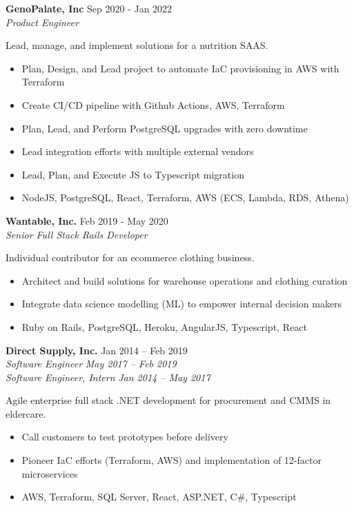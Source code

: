 \documentclass[line,margin]{res}
\begin{document}
\begin{resume}
\textbf{GenoPalate, Inc} \hfill Sep 2020 - Jan 2022 \\
{\sl Product Engineer}

Lead, manage, and implement solutions for a nutrition SAAS.

\begin{itemize}
\item Plan, Design, and Lead project to automate IaC provisioning in AWS with Terraform
\item Create CI/CD pipeline with Github Actions, AWS, Terraform
\item Plan, Lead, and Perform PostgreSQL upgrades with zero downtime
\item Lead integration efforts with multiple external vendors
\item Lead, Plan, and Execute JS to Typescript migration
\item NodeJS, PostgreSQL, React, Terraform, AWS (ECS, Lambda, RDS, Athena)
\end{itemize}

\textbf{Wantable, Inc.} \hfill Feb 2019 - May 2020 \\
{\sl Senior Full Stack Rails Developer}

Individual contributor for an ecommerce clothing business.

\begin{itemize}
\item Architect and build solutions for warehouse operations and clothing curation
\item Integrate data science modelling (ML) to empower internal decision makers
\item Ruby on Rails, PostgreSQL, Heroku, AngularJS, Typescript, React
\end{itemize}

\textbf{Direct Supply, Inc.} \hfill Jan 2014 -- Feb 2019 \\
{\sl Software Engineer} \hfill {\sl May 2017 -- Feb 2019} \\
{\sl Software Engineer, Intern} \hfill {\sl Jan 2014 -- May 2017}

Agile enterprise full stack .NET development for procurement and CMMS in eldercare.

\begin{itemize}
\item Call customers to test prototypes before delivery
\item Pioneer IaC efforts (Terraform, AWS) and implementation of 12-factor microservices
\item AWS, Terraform, SQL Server, React, ASP.NET, C\#, Typescript
\end{itemize}


\end{resume}
\end{document}
